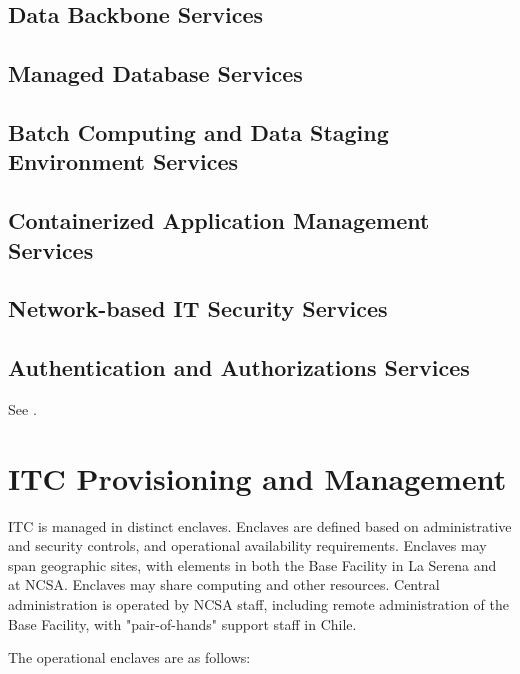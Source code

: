\subsection{Data Backbone Services}


\subsection{Managed Database Services}


\subsection{Batch Computing and Data Staging Environment Services}


\subsection{Containerized Application Management Services}


\subsection{Network-based IT Security Services}


\subsection{Authentication and Authorizations Services}
See .

\section{ITC Provisioning and Management}

ITC is managed in distinct enclaves. Enclaves are defined based on administrative 
and security controls, and operational availability requirements. Enclaves may 
span geographic sites, with elements in both the Base Facility in La Serena and 
at NCSA. Enclaves may share computing and other resources. Central administration 
is operated by NCSA staff, including remote administration of the Base Facility, 
with "pair-of-hands" support staff in Chile.

The operational enclaves are as follows:

